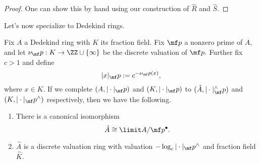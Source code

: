 \begin{proof}
	One can show this by hand using our construction of $\hat R$ and $\hat S.$
\end{proof}
Let's now specialize to Dedekind rings.
\begin{proposition}
	Fix $A$ a Dedekind ring with $K$ its fraction field. Fix $\mf p$ a nonzero prime of $A,$ and let $\nu_\mf p:K\to\ZZ\cup\{\infty\}$ be the discrete valuation of $\mf p.$ Further fix $c>1$ and define
	\[|x|_\mf p:=c^{-\nu_\mf p(x)},\]
	where $x\in K.$ If we complete $(A,|\cdot|_\mf p)$ and $(K,|\cdot|_\mf p)$ to $(\hat A,|\cdot|^\wedge_\mf p)$ and $(K,|\cdot|_\mf p^\wedge)$ respectively, then we have the following.
	\begin{enumerate}[label=(\alph*)]
		\item There is a canonical isomorphism
		\[\hat A\cong\limit A/\mf p^\bullet.\]
		\item $\hat A$ is a discrete valuation ring with valuation $-\log_c|\cdot|_\mf p^\wedge$ and fraction field $\hat K.$
	\end{enumerate}
\end{proposition}
